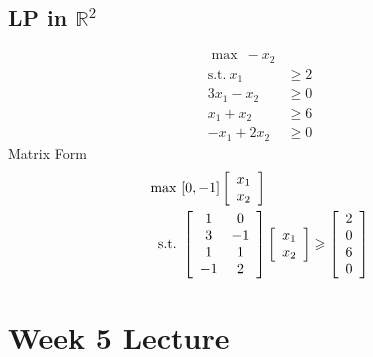 \documentclass[11pt]{article}
\numberwithin{equation}{section}
\begin{document}
\subsection{LP in \boldmath\texorpdfstring{$\mathbb{R}^2$}{R2}}
\begin{example}
    \begin{align*}
        \max\ -x_{2}& \\
        \text {s.t.}\ x_{1} &\geq 2 \\
        3x_{1}-x_{2} &\geq 0 \\
        x_{1}+x_{2} &\geq 6 \\
        -x_{1}+2 x_{2} &\geq 0
    \end{align*}
    Matrix Form
    \begin{align*}
        \max\ & [0,-1]\left[\begin{array}{l}
            x_{1} \\
            x_{2}
            \end{array}\right] \\
        \text{s.t.} \ & \left[\begin{array}{cc}
            1 & 0 \\
            3 & -1 \\
            1 & 1 \\
            -1 & 2
            \end{array}\right]\left[\begin{array}{l}
            x_{1} \\
            x_{2}
            \end{array}\right] \geqslant\left[\begin{array}{l}
            2 \\
            0 \\
            6 \\
            0
            \end{array}\right]
    \end{align*}
\end{example}


\newpage
\section{Week 5 Lecture}
\end{document}
